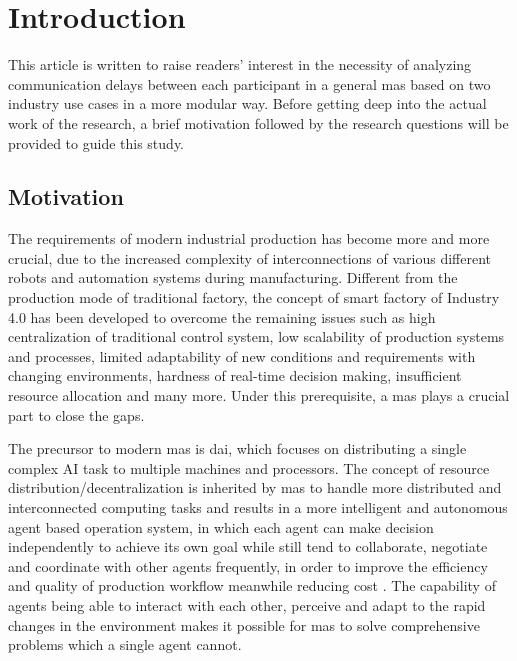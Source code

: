 \glsresetall%
\chapter{Introduction}%
This article is written to raise readers' interest in the necessity of 
analyzing communication delays between each participant in a general 
\gls{mas} based on two industry use cases in a more modular way. 
Before getting deep into the actual work of the research, 
a brief motivation followed by the research questions will be
provided to guide this study.

\section{Motivation}
The requirements of modern industrial production has become more and more crucial, due to the increased complexity of interconnections of various different robots and automation systems during manufacturing. Different from the production mode of traditional factory, the concept of smart factory of Industry 4.0 has been developed to overcome the remaining issues such as high centralization of traditional control system, low scalability of production systems and processes, limited adaptability of new conditions and requirements with changing environments, hardness of real-time decision making, insufficient resource allocation and many more. Under this prerequisite, a \gls{mas} plays a crucial part to close the gaps. 


The precursor to modern \gls{mas} is \gls{dai}, which focuses on distributing a single complex AI task to multiple machines and processors\cite{noauthor_jacques_nodate}. The concept of resource distribution/decentralization is inherited by \gls{mas} to handle more distributed and interconnected computing tasks and results in a more intelligent and autonomous agent based operation system, in which each agent can make decision independently to achieve its own goal while still tend to collaborate, negotiate and coordinate with other agents frequently, in order to improve the efficiency and quality of production workflow meanwhile reducing cost \cite{vogel-heuser_multi-agent_2020}. The capability of agents being able to interact with each other, perceive and adapt to the rapid changes in the environment makes it possible for \gls{mas} to solve comprehensive problems which a single agent cannot. 





